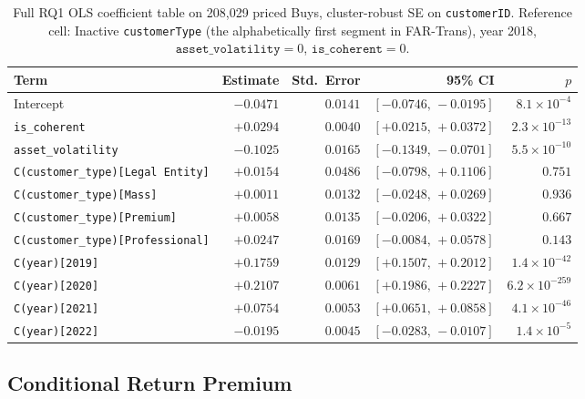 \begin{table}[!t]
\centering
\small
\begin{tabular}{lrrrr}
\toprule
Term & Estimate & Std.\ Error & 95\% CI & $p$ \\
\midrule
Intercept                                & $-0.0471$ & $0.0141$ & $[-0.0746,\, -0.0195]$ & $8.1 \times 10^{-4}$ \\
\texttt{is\_coherent}                    & $+0.0294$ & $0.0040$ & $[+0.0215,\, +0.0372]$ & $2.3 \times 10^{-13}$ \\
\texttt{asset\_volatility}               & $-0.1025$ & $0.0165$ & $[-0.1349,\, -0.0701]$ & $5.5 \times 10^{-10}$ \\
\texttt{C(customer\_type)[Legal Entity]} & $+0.0154$ & $0.0486$ & $[-0.0798,\, +0.1106]$ & $0.751$ \\
\texttt{C(customer\_type)[Mass]}         & $+0.0011$ & $0.0132$ & $[-0.0248,\, +0.0269]$ & $0.936$ \\
\texttt{C(customer\_type)[Premium]}      & $+0.0058$ & $0.0135$ & $[-0.0206,\, +0.0322]$ & $0.667$ \\
\texttt{C(customer\_type)[Professional]} & $+0.0247$ & $0.0169$ & $[-0.0084,\, +0.0578]$ & $0.143$ \\
\texttt{C(year)[2019]}                   & $+0.1759$ & $0.0129$ & $[+0.1507,\, +0.2012]$ & $1.4 \times 10^{-42}$ \\
\texttt{C(year)[2020]}                   & $+0.2107$ & $0.0061$ & $[+0.1986,\, +0.2227]$ & $6.2 \times 10^{-259}$ \\
\texttt{C(year)[2021]}                   & $+0.0754$ & $0.0053$ & $[+0.0651,\, +0.0858]$ & $4.1 \times 10^{-46}$ \\
\texttt{C(year)[2022]}                   & $-0.0195$ & $0.0045$ & $[-0.0283,\, -0.0107]$ & $1.4 \times 10^{-5}$ \\
\bottomrule
\end{tabular}
\caption{Full RQ1 OLS coefficient table on 208{,}029 priced Buys, cluster-robust SE on \texttt{customerID}. Reference cell: Inactive \texttt{customerType} (the alphabetically first segment in FAR-Trans), year 2018, $\texttt{asset\_volatility} = 0$, $\texttt{is\_coherent} = 0$.}
\label{tab:return-premium-ols}
\end{table}

\subsection{Conditional Return Premium}
\label{sec:rq1:return}

